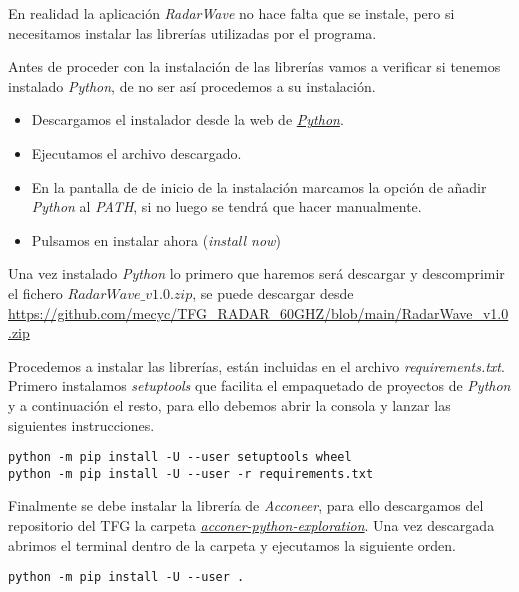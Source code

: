 En realidad la aplicación \textit{RadarWave} no hace falta que se instale, pero si necesitamos instalar las librerías utilizadas por el programa.

Antes de proceder con la instalación de las librerías vamos a verificar si tenemos instalado \textit{Python}, de no ser así procedemos a su instalación.
\begin{itemize}
\item Descargamos el instalador desde la web de \href{https://www.python.org/downloads/}{\textit{Python}}.
\item Ejecutamos el archivo descargado.
\item En la pantalla de de inicio de la instalación marcamos la opción de añadir \textit{Python} al \textit{PATH}, si no luego se tendrá que hacer manualmente.
\item Pulsamos en instalar ahora (\textit{install now})


\end{itemize}


Una vez instalado \textit{Python} lo primero que haremos será descargar y descomprimir el fichero \textit{$RadarWave\_v1.0.zip$}, se puede descargar desde \url{https://github.com/mecyc/TFG_RADAR_60GHZ/blob/main/RadarWave_v1.0.zip}

Procedemos a instalar las librerías, están incluidas en el archivo \textit{requirements.txt}. Primero instalamos \textit{setuptools} que facilita el empaquetado de proyectos de \textit{Python} y a continuación el resto, para ello debemos abrir la consola y lanzar las siguientes instrucciones.

\begin{verbatim}
python -m pip install -U --user setuptools wheel
python -m pip install -U --user -r requirements.txt
\end{verbatim}


Finalmente se debe instalar la librería de \textit{Acconeer}, para ello descargamos del repositorio del TFG la carpeta \href{https://github.com/mecyc/TFG_RADAR_60GHZ/tree/main/acconeer-python-exploration}{\textit{acconer-python-exploration}}. Una vez descargada abrimos el terminal dentro de la carpeta y ejecutamos la siguiente orden.\cite{Acconeer2021}

\begin{verbatim}
python -m pip install -U --user .
\end{verbatim}

